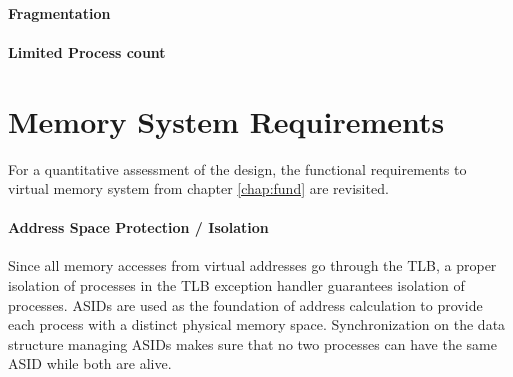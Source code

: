 


\paragraph*{Fragmentation}

\paragraph*{Limited Process count}

\section{Memory System Requirements}
For a quantitative assessment of the design, the functional requirements to virtual memory system from chapter \ref{chap:fund} are revisited.

\paragraph{Address Space Protection / Isolation} Since all memory accesses from virtual addresses go through the TLB, a proper isolation of processes in the TLB exception handler guarantees isolation of processes. ASIDs are used as the foundation of address calculation to provide each process with a distinct physical memory space.
Synchronization on the data structure managing ASIDs makes sure that no two processes can have the same ASID while both are alive.

